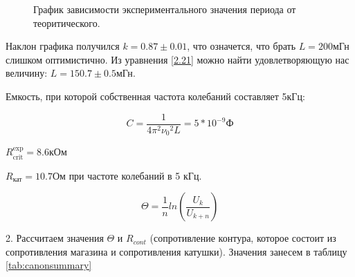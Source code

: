 \documentclass[a4paper,12pt]{article} %
\begin{document}
\begin{figure}[H]\label{periods}
	\caption{График зависимости экспериментального значения периода от теоритического.}
\label{fig:image}
\end{figure}

Наклон графика получился $k = 0.87 \pm 0.01$, что означется, что брать $L = 200$мГн слишком оптимистично. Из уравнения \eqref{2.21} можно найти удовлетворяющую нас величину: $L = 150.7 \pm 0.5 \text{мГн}.$

Емкость, при которой собственная частота колебаний составляет 5кГц:

\begin{equation}
    C = \frac{1}{4\pi^2{\nu_0}^2L} = 5*10^{-9} \text{Ф}
    \label{eq2:ref}
\end{equation}

$R_\text{crit}^\text{exp} = 8.6 \text{кОм}$

$R_{\text{кат}} = 10.7 \text{Ом}$ при частоте колебаний в 5 кГц. 

\begin{equation}
    \Theta = \frac{1}{n}ln\left(\frac{U_k}{U_{k+n}}\right)
    \label{eq4:ref}
\end{equation}

2. Рассчитаем значения $\Theta$ и $R_{cont}$ (сопротивление контура, которое состоит из сопротивления магазина и сопротивления катушки). Значения занесем в таблицу \eqref{tab:canonsummary}
\end{document}

